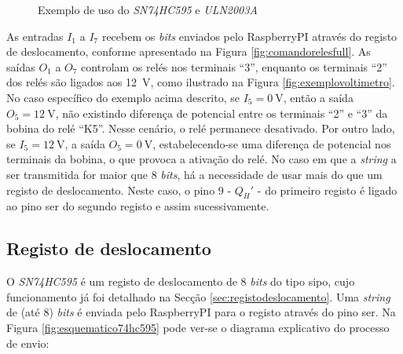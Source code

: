 \begin{figure}[hbtp]
	\centering%
		\centering
		\qquad
		\caption{Exemplo de uso do \textit{SN74HC595} e \textit{ULN2003A}}%
		\label{fig:ligacao5952003}%
	\end{figure}

As entradas $I_{1}$ a $I_{7}$ recebem os \textit{bits} enviados pelo \gls{RaspberryPI} através do registo de deslocamento, conforme apresentado na Figura \ref{fig:comandorelesfull}. As saídas $O_{1}$ a $O_{7}$ controlam os relés nos terminais ``3'', enquanto os terminais ``2'' dos relés são ligados aos \SI{12}{\volt}, como ilustrado na Figura \ref{fig:exemplovoltimetro}. No caso específico do exemplo acima descrito, se $I_{5} = \SI{0}{\volt}$, então a saída $O_{5} = \SI{12}{\volt}$, não existindo diferença de potencial entre os terminais ``2'' e ``3'' da bobina do relé ``K5''. Nesse cenário, o relé permanece desativado. Por outro lado, se $I_{5} = \SI{12}{\volt}$, a saída $O_{5} = \SI{0}{\volt}$, estabelecendo-se uma diferença de potencial nos terminais da bobina, o que provoca a ativação do relé. No caso em que a \textit{string} a ser transmitida for maior que 8 \textit{bits}, há a necessidade de usar mais do que um registo de deslocamento. Neste caso, o pino 9 - $Q_{H}'$ - do primeiro registo é ligado ao pino \acrshort{ser} do segundo registo e assim sucessivamente.

\subsection{Registo de deslocamento}
\label{sec:hwregistodeslocamento}
O \textit{SN74HC595} é um registo de deslocamento de 8 \textit{bits} do tipo \acrshort{sipo}, cujo funcionamento já foi detalhado na Secção \ref{sec:registodeslocamento}. Uma \textit{string} de (até 8) \textit{bits} é enviada pelo \gls{RaspberryPI} para o registo através do pino \acrshort{ser}. Na Figura \ref{fig:esquematico74hc595} pode ver-se o diagrama explicativo do processo de envio:

